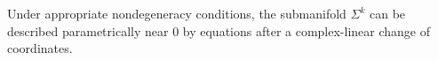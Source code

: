 
Under appropriate nondegeneracy conditions, the submanifold $\Sigma^k$ can be described parametrically near $0$ by equations after a complex-linear change of coordinates.
